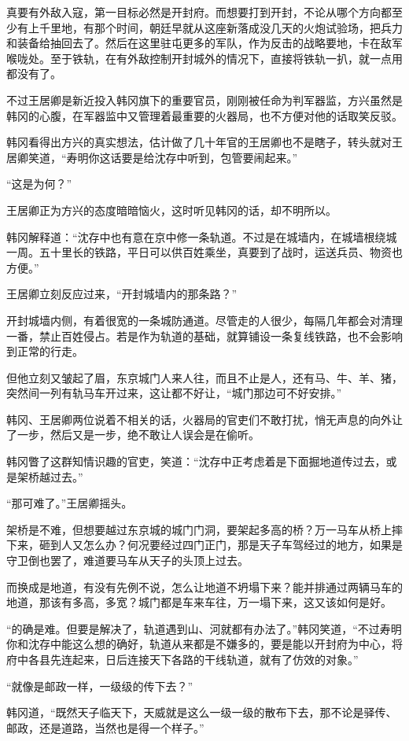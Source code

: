 真要有外敌入寇，第一目标必然是开封府。而想要打到开封，不论从哪个方向都至少有上千里地，有那个时间，朝廷早就从这座新落成没几天的火炮试验场，把兵力和装备给抽回去了。然后在这里驻屯更多的军队，作为反击的战略要地，卡在敌军喉咙处。至于铁轨，在有外敌控制开封城外的情况下，直接将铁轨一扒，就一点用都没有了。

不过王居卿是新近投入韩冈旗下的重要官员，刚刚被任命为判军器监，方兴虽然是韩冈的心腹，在军器监中又管理着最重要的火器局，也不方便对他的话取笑反驳。

韩冈看得出方兴的真实想法，估计做了几十年官的王居卿也不是瞎子，转头就对王居卿笑道，“寿明你这话要是给沈存中听到，包管要闹起来。”

“这是为何？”

王居卿正为方兴的态度暗暗恼火，这时听见韩冈的话，却不明所以。

韩冈解释道：“沈存中也有意在京中修一条轨道。不过是在城墙内，在城墙根绕城一周。五十里长的铁路，平日可以供百姓乘坐，真要到了战时，运送兵员、物资也方便。”

王居卿立刻反应过来，“开封城墙内的那条路？”

开封城墙内侧，有着很宽的一条城防通道。尽管走的人很少，每隔几年都会对清理一番，禁止百姓侵占。若是作为轨道的基础，就算铺设一条复线铁路，也不会影响到正常的行走。

但他立刻又皱起了眉，东京城门人来人往，而且不止是人，还有马、牛、羊、猪，突然间一列有轨马车开过来，这让都不好让，“城门那边可不好安排。”

韩冈、王居卿两位说着不相关的话，火器局的官吏们不敢打扰，悄无声息的向外让了一步，然后又是一步，绝不敢让人误会是在偷听。

韩冈瞥了这群知情识趣的官吏，笑道：“沈存中正考虑着是下面掘地道传过去，或是架桥越过去。”

“那可难了。”王居卿摇头。

架桥是不难，但想要越过东京城的城门门洞，要架起多高的桥？万一马车从桥上摔下来，砸到人又怎么办？何况要经过四门正门，那是天子车驾经过的地方，如果是守卫倒也罢了，难道要马车从天子的头顶上过去。

而换成是地道，有没有先例不说，怎么让地道不坍塌下来？能并排通过两辆马车的地道，那该有多高，多宽？城门都是车来车往，万一塌下来，这又该如何是好。

“的确是难。但要是解决了，轨道遇到山、河就都有办法了。”韩冈笑道，“不过寿明你和沈存中能这么想的确好，轨道从来都是不嫌多的，要是能以开封府为中心，将府中各县先连起来，日后连接天下各路的干线轨道，就有了仿效的对象。”

“就像是邮政一样，一级级的传下去？”

韩冈道，“既然天子临天下，天威就是这么一级一级的散布下去，那不论是驿传、邮政，还是道路，当然也是得一个样子。”
